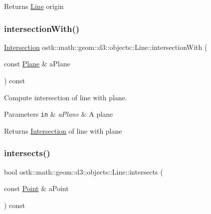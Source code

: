 \begin{DoxyReturn}{Returns}
\hyperlink{classostk_1_1math_1_1geom_1_1d3_1_1objects_1_1_line}{Line} origin 
\end{DoxyReturn}
\mbox{\label{classostk_1_1math_1_1geom_1_1d3_1_1objects_1_1_line_a3dba3152c9257eb58f2437c687e410db}} 
\subsubsection{\texorpdfstring{intersection\+With()}{intersectionWith()}}
{\footnotesize\ttfamily \hyperlink{classostk_1_1math_1_1geom_1_1d3_1_1_intersection}{Intersection} ostk\+::math\+::geom\+::d3\+::objects\+::\+Line\+::intersection\+With (\begin{DoxyParamCaption}\item[{const \hyperlink{classostk_1_1math_1_1geom_1_1d3_1_1objects_1_1_plane}{Plane} \&}]{a\+Plane }\end{DoxyParamCaption}) const}



Compute intersection of line with plane. 


\begin{DoxyParams}[1]{Parameters}
\mbox{\tt in}  & {\em a\+Plane} & A plane \\
\hline
\end{DoxyParams}
\begin{DoxyReturn}{Returns}
\hyperlink{classostk_1_1math_1_1geom_1_1d3_1_1_intersection}{Intersection} of line with plane 
\end{DoxyReturn}
\mbox{\label{classostk_1_1math_1_1geom_1_1d3_1_1objects_1_1_line_a65d3865e67da2d1629fa1e302a2c62fe}} 
\subsubsection{\texorpdfstring{intersects()}{intersects()}\hspace{0.1cm}{\footnotesize\ttfamily [1/4]}}
{\footnotesize\ttfamily bool ostk\+::math\+::geom\+::d3\+::objects\+::\+Line\+::intersects (\begin{DoxyParamCaption}\item[{const \hyperlink{classostk_1_1math_1_1geom_1_1d3_1_1objects_1_1_point}{Point} \&}]{a\+Point }\end{DoxyParamCaption}) const}



